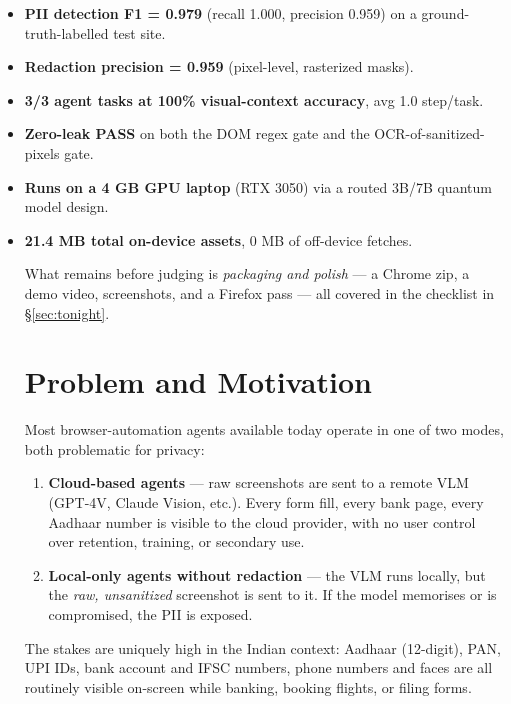 \documentclass[11pt,a4paper]{article}
\begin{document}
\begin{itemize}
\item \textbf{PII detection F1 = 0.979} (recall 1.000, precision 0.959) on a ground-truth-labelled test site.
\item \textbf{Redaction precision = 0.959} (pixel-level, rasterized masks).
\item \textbf{3/3 agent tasks at 100\% visual-context accuracy}, avg 1.0 step/task.
\item \textbf{Zero-leak PASS} on both the DOM regex gate and the OCR-of-sanitized-pixels gate.
\item \textbf{Runs on a 4 GB GPU laptop} (RTX 3050) via a routed 3B/7B quantum model design.
\item \textbf{21.4 MB total on-device assets}, 0 MB of off-device fetches.

What remains before judging is \emph{packaging and polish} --- a Chrome zip, a demo video, screenshots, and a Firefox pass --- all covered in the checklist in \S\ref{sec:tonight}.

\section{Problem and Motivation}

Most browser-automation agents available today operate in one of two modes, both problematic for privacy:

\begin{enumerate}
\item \textbf{Cloud-based agents} --- raw screenshots are sent to a remote VLM (GPT-4V, Claude Vision, etc.). Every form fill, every bank page, every Aadhaar number is visible to the cloud provider, with no user control over retention, training, or secondary use.
\item \textbf{Local-only agents without redaction} --- the VLM runs locally, but the \emph{raw, unsanitized} screenshot is sent to it. If the model memorises or is compromised, the PII is exposed.
\end{enumerate}

The stakes are uniquely high in the Indian context: Aadhaar (12-digit), PAN, UPI IDs, bank account and IFSC numbers, phone numbers and faces are all routinely visible on-screen while banking, booking flights, or filing forms.


\end{itemize}
\end{document}
